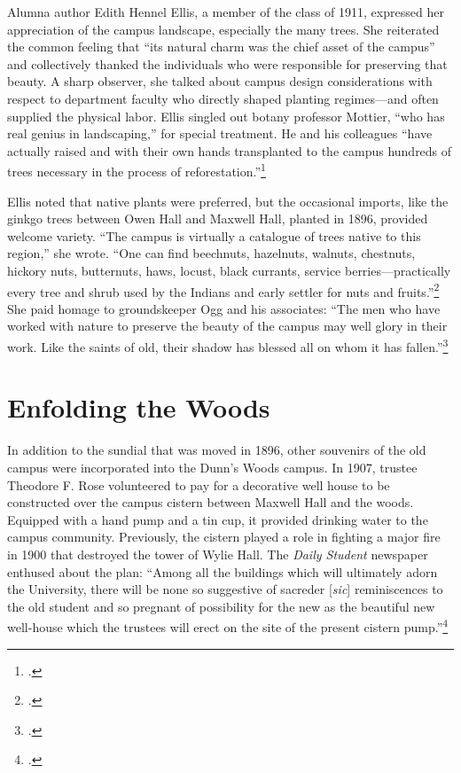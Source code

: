 \documentclass[
  american,
  letterpaper,
]{scrreprt}
\begin{document}
Alumna author Edith Hennel Ellis, a member of the class of 1911,
expressed her appreciation of the campus landscape, especially the many
trees. She reiterated the common feeling that ``its natural charm was
the chief asset of the campus'' and collectively thanked the individuals
who were responsible for preserving that beauty. A sharp observer, she
talked about campus design considerations with respect to department
faculty who directly shaped planting regimes---and often supplied the
physical labor. Ellis singled out botany professor Mottier, ``who has
real genius in landscaping,'' for special treatment. He and his
colleagues ``have actually raised and with their own hands transplanted
to the campus hundreds of trees necessary in the process of
reforestation.''\footnote{.}

Ellis noted that native plants were preferred, but the occasional
imports, like the ginkgo trees between Owen Hall and Maxwell Hall,
planted in 1896, provided welcome variety. ``The campus is virtually a
catalogue of trees native to this region,'' she wrote. ``One can find
beechnuts, hazelnuts, walnuts, chestnuts, hickory nuts, butternuts,
haws, locust, black currants, service berries---practically every tree
and shrub used by the Indians and early settler for nuts and
fruits.''\footnote{.} She paid
homage to groundskeeper Ogg and his associates: ``The men who have
worked with nature to preserve the beauty of the campus may well glory
in their work. Like the saints of old, their shadow has blessed all on
whom it has fallen.''\footnote{.}

\section{Enfolding the Woods}\label{enfolding-the-woods}

In addition to the sundial that was moved in 1896, other souvenirs of
the old campus were incorporated into the Dunn's Woods campus. In 1907,
trustee Theodore F. Rose volunteered to pay for a decorative well house
to be constructed over the campus cistern between Maxwell Hall and the
woods. Equipped with a hand pump and a tin cup, it provided drinking
water to the campus community. Previously, the cistern played a role in
fighting a major fire in 1900 that destroyed the tower of Wylie Hall.
The \emph{Daily Student} newspaper enthused about the plan: ``Among all
the buildings which will ultimately adorn the University, there will be
none so suggestive of sacreder {[}\emph{sic}{]} reminiscences to the old
student and so pregnant of possibility for the new as the beautiful new
well-house which the trustees will erect on the site of the present
cistern pump.''\footnote{.}
\end{document}
